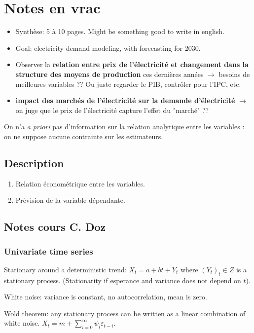 \section{Notes en vrac}
\begin{itemize}
    \item Synthèse: 5 à 10 pages. Might be something good to write in english.
    \item Goal: electricity demand modeling, with forecasting for 2030. 
    \item Observer la \textbf{relation entre prix de l'électricité et changement dans la structure des moyens de production} ces dernières années $\to$ besoins de meilleures variables ?? Ou juste regarder le PIB, contrôler pour l'IPC, etc.
    \item \textbf{impact des marchés de l'électricité sur la demande d'électricité} $\to$ on juge que le prix de l'électricité capture l'effet du "marché" ??
\end{itemize}

On n'a \textit{a priori} pas d'information sur la relation analytique entre les variables : on ne suppose aucune contrainte sur les estimateurs.



\subsection{Description}
\begin{enumerate}
    \item Relation économétrique entre les variables. 
    \item Prévision de la variable dépendante.
\end{enumerate}


\subsection{Notes cours C. Doz}

\subsubsection{Univariate time series}
Stationary around a deterministic trend: $X_t = a + bt + Y_t$ where $(Y_t)_t \in Z$ is a stationary process. (Stationarity if esperance and variance does not depend on $t$).

White noise: variance is constant, no autocorrelation, mean is zero.

Wold theorem: any stationary process can be written as a linear combination of white noise. $X_t = m + \sum_{i=0}^{\infty} \psi_i \varepsilon_{t-i}$. \\



